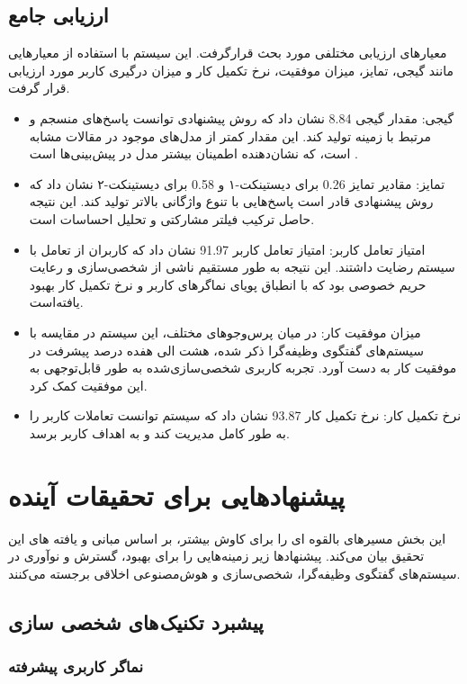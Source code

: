 \subsection{ارزیابی جامع}
 معیارهای ارزیابی مختلفی مورد بحث قرارگرفت. این سیستم با استفاده از معیارهایی مانند گیجی، تمایز، میزان موفقیت، نرخ تکمیل کار و میزان درگیری کاربر مورد ارزیابی قرار گرفت.
\begin{itemize}
\item
 گیجی: مقدار گیجی
\num{8.84}
 نشان داد که روش پیشنهادی توانست پاسخ‌های منسجم و مرتبط با زمینه تولید کند. این مقدار کمتر از مدل‌های موجود در مقالات مشابه است، که نشان‌دهنده اطمینان بیشتر مدل در پیش‌بینی‌ها است .
\item
 تمایز: مقادیر تمایز
\num{0.26}
برای دیستینکت-۱ و 
\num{0.58}
 برای دیستینکت-۲ نشان داد که روش پیشنهادی قادر است پاسخ‌هایی با تنوع واژگانی بالاتر تولید کند. این نتیجه حاصل ترکیب فیلتر مشارکتی و تحلیل احساسات است.
\item
 امتیاز تعامل کاربر: امتیاز تعامل کاربر 
\num{91.97}
 نشان داد که کاربران از تعامل با سیستم رضایت داشتند. این نتیجه به طور مستقیم ناشی از شخصی‌سازی و رعایت حریم خصوصی بود که با انطباق پویای نماگر‌های کاربر و نرخ تکمیل کار بهبود یافته‌است.
\item
 میزان موفقیت کار: در میان پرس‌وجوهای مختلف، این سیستم در مقایسه با سیستم‌های گفتگوی وظیفه‌گرا ذکر شده، هشت الی هفده درصد پیشرفت در موفقیت کار به دست آورد. تجربه کاربری شخصی‌سازی‌شده به طور قابل‌توجهی به این موفقیت کمک کرد. 
\item
نرخ تکمیل کار: نرخ تکمیل کار 
\num{93.87}
 نشان داد که سیستم توانست تعاملات کاربر را به طور کامل مدیریت کند و به اهداف کاربر برسد.
\end{itemize}


\section{پیشنهادهایی برای تحقیقات آینده}
این بخش مسیرهای بالقوه ای را برای کاوش بیشتر، بر اساس مبانی و یافته های این تحقیق بیان می‌کند. پیشنهادها زیر زمینه‌هایی را برای بهبود، گسترش و نوآوری در سیستم‌های گفتگوی وظیفه‌گرا، شخصی‌سازی و هوش‌مصنوعی اخلاقی برجسته می‌کنند.

\subsection{پیشبرد تکنیک های شخصی سازی}

\subsubsection{نماگر کاربری پیشرفته}

